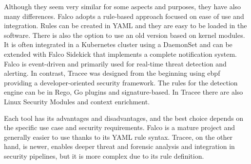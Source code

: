 Although they seem very similar for some aspects and purposes, they have also many differences. Falco adopts a rule-based approach focused on ease of use and integration. Rules can be created in YAML and they are easy to be loaded in the software. There is also the option to use an old version based on kernel modules. It is often integrated in a Kubernetes cluster using a DaemonSet and can be extended with Falco Sidekick that implements a complete notification system. Falco is event-driven and primarily used for real-time threat detection and alerting. In contrast, Tracee was designed from the beginning using \ac{ebpf} providing a developer-oriented security framework. The rules for the detection engine can be in Rego, Go plugins and signature-based. In Tracee there are also Linux Security Modules and context enrichment.

Each tool has its advantages and disadvantages, and the best choice depends on the specific use case and security requirements. Falco is a mature project and generally easier to use thanks to its YAML rule syntax. Tracee, on the other hand, is newer, enables deeper threat and forensic analysis and integration in security pipelines, but it is more complex due to its rule definition.

